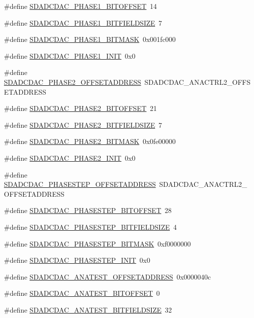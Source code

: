 \begin{DoxyCompactItemize}
\item 
\#define \hyperlink{a00569_a809b041afd13013fd666a3c323f3ed19}{SDADCDAC\_\-PHASE1\_\-BITOFFSET}~14
\item 
\#define \hyperlink{a00569_a26da5f1b84433dbad4d769d19d768985}{SDADCDAC\_\-PHASE1\_\-BITFIELDSIZE}~7
\item 
\#define \hyperlink{a00569_a8a09db57855c320689509bc4c0af0469}{SDADCDAC\_\-PHASE1\_\-BITMASK}~0x001fc000
\item 
\#define \hyperlink{a00569_a7ccb8ae1299a302ca52be3893fb68e08}{SDADCDAC\_\-PHASE1\_\-INIT}~0x0
\item 
\#define \hyperlink{a00569_abc39eaeb6de62d6dd6c29df349c9b39a}{SDADCDAC\_\-PHASE2\_\-OFFSETADDRESS}~SDADCDAC\_\-ANACTRL2\_\-OFFSETADDRESS
\item 
\#define \hyperlink{a00569_a76d8ca0ad8e2dd346e4d1f050d00be04}{SDADCDAC\_\-PHASE2\_\-BITOFFSET}~21
\item 
\#define \hyperlink{a00569_a09f0f6d05f3f6acbb540b64317361e4a}{SDADCDAC\_\-PHASE2\_\-BITFIELDSIZE}~7
\item 
\#define \hyperlink{a00569_acee6c5c6d17d616fb1b055f32d7ee53b}{SDADCDAC\_\-PHASE2\_\-BITMASK}~0x0fe00000
\item 
\#define \hyperlink{a00569_a85614e553894be5b6b649a34cdec924c}{SDADCDAC\_\-PHASE2\_\-INIT}~0x0
\item 
\#define \hyperlink{a00569_a583d2c35e37f0af601f109dce35bb8ee}{SDADCDAC\_\-PHASESTEP\_\-OFFSETADDRESS}~SDADCDAC\_\-ANACTRL2\_\-OFFSETADDRESS
\item 
\#define \hyperlink{a00569_a54a0fc813cf6f83a43ed46affbc960cd}{SDADCDAC\_\-PHASESTEP\_\-BITOFFSET}~28
\item 
\#define \hyperlink{a00569_a9f50db94e43748f762bc4e12657870da}{SDADCDAC\_\-PHASESTEP\_\-BITFIELDSIZE}~4
\item 
\#define \hyperlink{a00569_afa92a080878e7c8c285e6dddda542f1e}{SDADCDAC\_\-PHASESTEP\_\-BITMASK}~0xf0000000
\item 
\#define \hyperlink{a00569_acaacfbd94e5fee712d90f14f41cd919f}{SDADCDAC\_\-PHASESTEP\_\-INIT}~0x0
\item 
\#define \hyperlink{a00569_aa9bf26509cee026f70486cebb0389ebc}{SDADCDAC\_\-ANATEST\_\-OFFSETADDRESS}~0x0000040c
\item 
\#define \hyperlink{a00569_a1e20a9568183b4bc2ecc289133b59e55}{SDADCDAC\_\-ANATEST\_\-BITOFFSET}~0
\item 
\#define \hyperlink{a00569_a917ff8da03f1a54ecbcb9ad857286564}{SDADCDAC\_\-ANATEST\_\-BITFIELDSIZE}~32
\item 

\end{DoxyCompactItemize}
